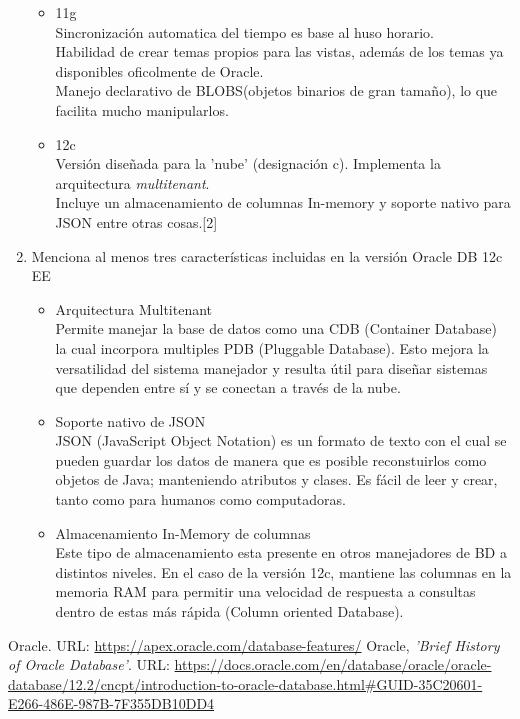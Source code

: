 \documentclass[10pt]{article}
\begin{document}
\begin{enumerate}
\begin{itemize}
{			}
			\item {11g \\
			Sincronización automatica del tiempo es base al huso horario. \\
			Habilidad de crear temas propios para las vistas, además de los 
			temas ya disponibles oficolmente de Oracle. \\
			Manejo declarativo de BLOBS(objetos binarios de gran tamaño), lo que
			facilita mucho manipularlos.
			}
			\item {12c \\
			Versión diseñada para la 'nube' (designación c).
			Implementa la arquitectura \textit{multitenant}.\\
			Incluye un almacenamiento de columnas In-memory y soporte nativo para JSON entre otras cosas.\footnotesize{}[2]
			}
		\end{itemize}
        \item Menciona al menos tres características incluidas en la versión Oracle DB 12c EE\\
		\begin{itemize}
			\item {
                Arquitectura Multitenant \\
                Permite manejar la base de datos como una CDB (Container Database) la cual incorpora multiples PDB (Pluggable Database). Esto mejora la versatilidad del sistema manejador y resulta útil para diseñar sistemas que dependen entre sí y se conectan a través de la nube. 
			}
			\item {
                Soporte nativo de JSON \\
                JSON (JavaScript Object Notation) es un formato de texto con el cual se pueden guardar los datos de manera que es posible reconstuirlos como objetos de Java; manteniendo atributos y clases. Es fácil de leer y crear, tanto como para humanos como computadoras.
			}
			\item {
                Almacenamiento In-Memory de columnas \\
                Este tipo de almacenamiento esta presente en otros manejadores de BD a distintos niveles. En el caso de la versión 12c, mantiene las columnas en la memoria RAM para permitir una velocidad de respuesta a consultas dentro de estas más rápida (Column oriented Database).
			}
		\end{itemize}
	
	\end{enumerate}

\begin{thebibliography}{}
	\bibitem{}Oracle. URL: \url{https://apex.oracle.com/database-features/}
	\bibitem{}Oracle, \textit{'Brief History of Oracle Database'}. URL: \url{https://docs.oracle.com/en/database/oracle/oracle-database/12.2/cncpt/introduction-to-oracle-database.html#GUID-35C20601-E266-486E-987B-7F355DB10DD4}
\end{thebibliography}

 
\end{document}
